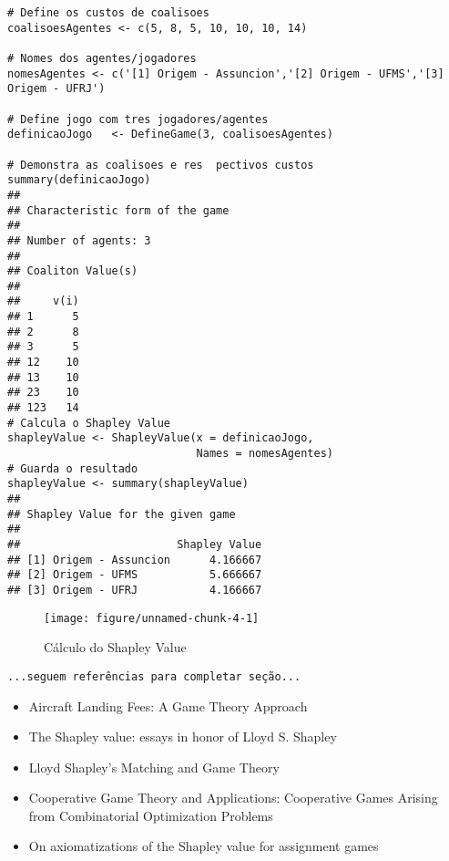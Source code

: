\documentclass[
	article,			        %
	11pt,				          %
	oneside,			        %
	a4paper,			        %
	english,			        %
	brazil,				        %
	sumario=tradicional
]{abntex2}\usepackage[]{graphicx}\usepackage[]{color}
\makeatletter
\def\maxwidth{ %
  \ifdim\Gin@nat@width>\linewidth
    \linewidth
  \else
    \Gin@nat@width
  \fi
}
\newenvironment{kframe}{%
 \def\at@end@of@kframe{}%
 \ifinner\ifhmode%
  \def\at@end@of@kframe{\end{minipage}}%
  \begin{minipage}{\columnwidth}%
 \fi\fi%
 \def\FrameCommand##1{\hskip\@totalleftmargin \hskip-\fboxsep
 \colorbox{shadecolor}{##1}\hskip-\fboxsep
     \hskip-\linewidth \hskip-\@totalleftmargin \hskip\columnwidth}%
 \MakeFramed {\advance\hsize-\width
   \@totalleftmargin\z@ \linewidth\hsize
   \@setminipage}}%
 {\par\unskip\endMakeFramed%
 \at@end@of@kframe}
\newenvironment{knitrout}{}{} %
\makeatother
\begin{document}
\begin{knitrout}
\color{fgcolor}\begin{kframe}
\begin{verbatim}
# Define os custos de coalisoes
coalisoesAgentes <- c(5, 8, 5, 10, 10, 10, 14)

# Nomes dos agentes/jogadores
nomesAgentes <- c('[1] Origem - Assuncion','[2] Origem - UFMS','[3] Origem - UFRJ')

# Define jogo com tres jogadores/agentes
definicaoJogo   <- DefineGame(3, coalisoesAgentes)

# Demonstra as coalisoes e res  pectivos custos
summary(definicaoJogo)
## 
## Characteristic form of the game 
## 
## Number of agents: 3 
## 
## Coaliton Value(s) 
## 
##     v(i)
## 1      5
## 2      8
## 3      5
## 12    10
## 13    10
## 23    10
## 123   14
# Calcula o Shapley Value
shapleyValue <- ShapleyValue(x = definicaoJogo, 
                             Names = nomesAgentes)
# Guarda o resultado
shapleyValue <- summary(shapleyValue)
## 
## Shapley Value for the given game 
## 
##                        Shapley Value
## [1] Origem - Assuncion      4.166667
## [2] Origem - UFMS           5.666667
## [3] Origem - UFRJ           4.166667
\end{verbatim}
\end{kframe}
\end{knitrout}

\begin{knitrout}
\color{fgcolor}\begin{figure}[H]

{\centering \texttt{[image: figure/unnamed-chunk-4-1]} 

}

\caption[Cálculo do Shapley Value]{Cálculo do Shapley Value}\label{fig:unnamed-chunk-4}
\end{figure}


\end{knitrout}


  \texttt{\color{red}...seguem referências para completar seção...}
  \begin{itemize}
    \item Aircraft Landing Fees: A Game Theory Approach \cite{Littlechild.1977}
    \item The Shapley value: essays in honor of Lloyd S. Shapley \cite{Alvin.1988}
    \item Lloyd Shapley's Matching and Game Theory \cite{Serrano.2013}
    \item Cooperative Game Theory and Applications: Cooperative Games Arising from Combinatorial Optimization Problems \cite{Curiel.2013}
    \item On axiomatizations of the Shapley value for assignment games \cite{Brink.2015}
  \end{itemize}
\end{document}
